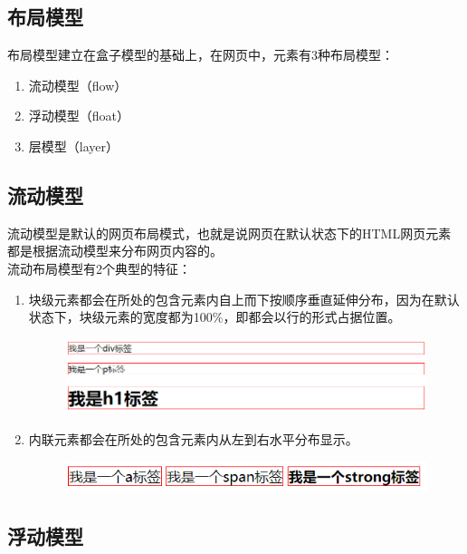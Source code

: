 \subsection{布局模型}

布局模型建立在盒子模型的基础上，在网页中，元素有3种布局模型：

\begin{enumerate}
    \item 流动模型（flow）
    \item 浮动模型（float）
    \item 层模型（layer）
\end{enumerate}

\subsection{流动模型}

流动模型是默认的网页布局模式，也就是说网页在默认状态下的HTML网页元素都是根据流动模型来分布网页内容的。 \\

流动布局模型有2个典型的特征：

\begin{enumerate}
    \item 块级元素都会在所处的包含元素内自上而下按顺序垂直延伸分布，因为在默认状态下，块级元素的宽度都为100\%，即都会以行的形式占据位置。
          \begin{figure}[H]
              \centering
              \includegraphics[scale=0.7]{img/C8/8-3/1.png}
          \end{figure}

    \item 内联元素都会在所处的包含元素内从左到右水平分布显示。
          \begin{figure}[H]
              \centering
              \includegraphics[]{img/C8/8-3/2.png}
          \end{figure}
\end{enumerate}

\subsection{浮动模型}

